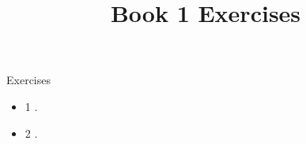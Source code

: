 \documentclass{ximera}
\title{Book 1 Exercises}
\begin{document}
\begin{abstract}
\end{abstract}

\maketitle

\begin{sectionOutcomes}

Exercises

\begin{itemize}
\item 1 .
\item 2 .
\end{itemize}

\end{sectionOutcomes}
\end{document}
